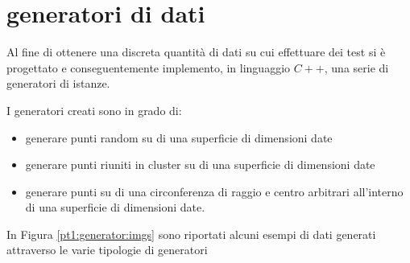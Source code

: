 %
%
\section[Generatori di dati]{generatori di dati}
\label{pt1:generator}
Al fine di ottenere una discreta quantità di dati su cui effettuare dei test si è progettato e conseguentemente implemento, in linguaggio $C++$,
una serie di generatori di istanze.

I generatori creati sono in grado di:

\begin{itemize}
\item generare punti random su di una superficie di dimensioni date
\item generare punti riuniti in cluster su di una superficie di dimensioni date
\item generare punti su di una circonferenza di raggio e centro arbitrari all'interno di una superficie di dimensioni date.
\end{itemize}

In Figura \ref{pt1:generator:imgs} sono riportati alcuni esempi di dati generati attraverso le varie tipologie di generatori

